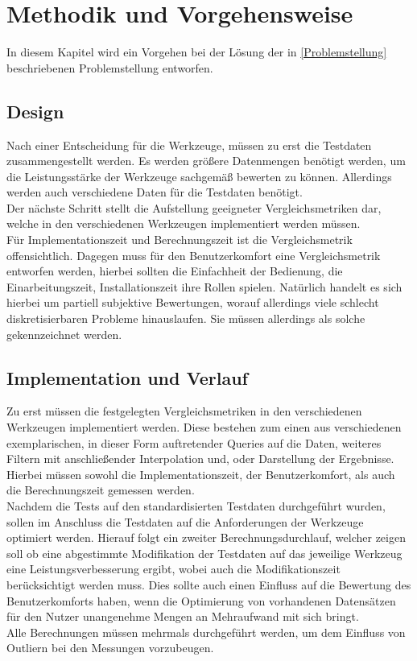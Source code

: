 \documentclass[
	12pt,
	a4paper,
	BCOR10mm,
	DIV14,
	listof=totoc,
	bibliography=totoc,
	headsepline
]{scrreprt}
\begin{document}

\chapter{Methodik und Vorgehensweise}
\label{Methodik und Vorgehensweise}
In diesem Kapitel wird ein Vorgehen bei der Lösung der in \ref{Problemstellung} beschriebenen Problemstellung entworfen.
\section{Design}
Nach einer Entscheidung für die Werkzeuge, müssen zu erst die Testdaten zusammengestellt werden.
Es werden größere Datenmengen benötigt werden, um die Leistungsstärke der Werkzeuge sachgemäß bewerten zu können.
Allerdings werden auch verschiedene Daten für die Testdaten benötigt. \\
Der nächste Schritt stellt die Aufstellung geeigneter Vergleichsmetriken dar, welche in den verschiedenen Werkzeugen implementiert werden müssen. \\
Für Implementationszeit und Berechnungszeit ist die Vergleichsmetrik offensichtlich.
Dagegen muss für den Benutzerkomfort eine Vergleichsmetrik entworfen werden, hierbei sollten die Einfachheit der Bedienung, die Einarbeitungszeit, Installationszeit ihre Rollen spielen.
Natürlich handelt es sich hierbei um partiell subjektive Bewertungen, worauf allerdings viele schlecht diskretisierbaren Probleme hinauslaufen. 
Sie müssen allerdings als solche gekennzeichnet werden.

\section{Implementation und Verlauf}
Zu erst müssen die festgelegten Vergleichsmetriken in den verschiedenen Werkzeugen implementiert werden.
Diese bestehen zum einen aus verschiedenen exemplarischen, in dieser Form auftretender Queries auf die Daten, weiteres Filtern mit anschließender Interpolation und, oder Darstellung der Ergebnisse.
Hierbei müssen sowohl die Implementationszeit, der Benutzerkomfort, als auch die Berechnungszeit gemessen werden. \\
Nachdem die Tests auf den standardisierten Testdaten durchgeführt wurden, sollen im Anschluss die Testdaten auf die Anforderungen der Werkzeuge optimiert werden. 
Hierauf folgt ein zweiter Berechnungsdurchlauf, welcher zeigen soll ob eine abgestimmte Modifikation der Testdaten auf das jeweilige Werkzeug eine Leistungsverbesserung ergibt, wobei auch die Modifikationszeit berücksichtigt werden muss. 
Dies sollte auch einen Einfluss auf die Bewertung des Benutzerkomforts haben, wenn die Optimierung von vorhandenen Datensätzen für den Nutzer unangenehme Mengen an Mehraufwand mit sich bringt. \\
Alle Berechnungen müssen mehrmals durchgeführt werden, um dem Einfluss von Outliern bei den Messungen vorzubeugen. \\
\end{document}
